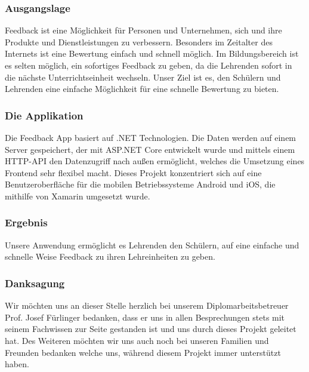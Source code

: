 \subsubsection{Ausgangslage}
Feedback ist eine Möglichkeit für Personen und Unternehmen, sich und ihre Produkte und Dienstleistungen zu verbessern. 
Besonders im Zeitalter des Internets ist eine Bewertung einfach und schnell möglich. Im Bildungsbereich ist es selten möglich, ein sofortiges Feedback zu geben, 
da die Lehrenden sofort in die nächste Unterrichtseinheit wechseln.
Unser Ziel ist es, den Schülern und Lehrenden eine einfache Möglichkeit für eine schnelle Bewertung zu bieten.

\subsubsection{Die Applikation}
Die Feedback App basiert auf .NET Technologien. Die Daten werden auf einem Server gespeichert, 
der mit ASP.NET Core entwickelt wurde und mittels einem HTTP-API den Datenzugriff nach außen ermöglicht, welches 
die Umsetzung eines Frontend sehr flexibel macht. Dieses Projekt konzentriert sich auf eine Benutzeroberfläche für die 
mobilen Betriebssysteme Android und iOS, die mithilfe von Xamarin umgesetzt wurde.

\subsubsection{Ergebnis}
Unsere Anwendung ermöglicht es Lehrenden den Schülern, auf eine einfache und schnelle Weise Feedback zu ihren Lehreinheiten zu geben.

\newpage
\subsubsection{Danksagung}
Wir möchten uns an dieser Stelle herzlich bei unserem Diplomarbeitsbetreuer Prof. Josef Fürlinger bedanken, 
dass er uns in allen Besprechungen stets mit seinem Fachwissen zur Seite gestanden ist und uns durch dieses Projekt geleitet hat.
Des Weiteren möchten wir uns auch noch bei unseren Familien und Freunden bedanken welche uns, während diesem Projekt immer unterstützt haben.


